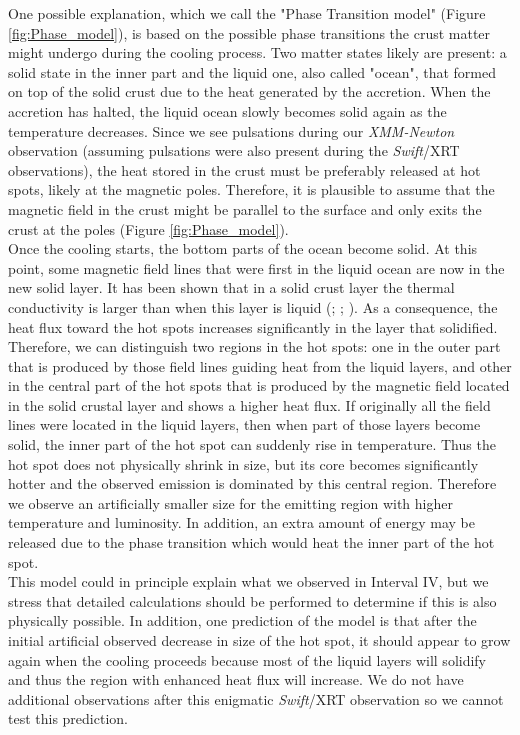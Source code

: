 \documentclass[a4paper,fleqn,usenatbib]{mnras}
\begin{document}
\indent One possible explanation, which we call the "Phase Transition model" (Figure \ref{fig:Phase_model}), is based on the possible phase transitions the crust matter might undergo during the cooling process. Two matter states likely are present: a solid state in the inner part and the liquid one, also called "ocean", that formed on top of the solid crust due to the heat generated by the accretion. When the accretion has halted, the liquid ocean slowly becomes solid again as the temperature decreases. Since we see pulsations during our \textit{XMM-Newton} observation (assuming pulsations were also present during the \textit{Swift}/XRT observations), the heat stored in the crust must be preferably released at hot spots, likely at the magnetic poles. Therefore, it is plausible to assume that the magnetic field in the crust might be parallel to the surface and only exits the crust at the poles (Figure \ref{fig:Phase_model}).\\
\indent Once the cooling starts, the bottom parts of the ocean become solid. At this point, some magnetic field lines that were first in the liquid ocean are now in the new solid layer. It has been shown that in a solid crust layer the thermal conductivity is larger than when this layer is liquid (\citealt{Horowitz2007}; \citealt{Brown2009}; \citealt{Mckinven2016}). As a consequence, the heat flux toward the hot spots increases significantly in the layer that solidified. Therefore, we can distinguish two regions in the hot spots: one in the outer part that is produced by those field lines guiding heat from the liquid layers, and other in the central part of the hot spots that is produced by the magnetic field located in the solid crustal layer and shows a higher heat flux. If originally all the field lines were located in the liquid layers, then when part of those layers become solid, the inner part of the hot spot can suddenly rise in temperature. Thus the hot spot does not physically shrink in size, but its core becomes significantly hotter and the observed emission is dominated by this central region. Therefore we observe an artificially smaller size for the emitting region with higher temperature and luminosity. In addition, an extra amount of energy may be released due to the phase transition which would heat the inner part of the hot spot.\\
\indent This model could in principle explain what we observed in Interval IV, but we stress that detailed calculations should be performed to determine if this is also physically possible. In addition, one prediction of the model is that after the initial artificial observed decrease in size of the hot spot, it should appear to grow again when the cooling proceeds because most of the liquid layers will solidify and thus the region with enhanced heat flux will increase. We do not have additional observations after this enigmatic \textit{Swift}/XRT observation so we cannot test this prediction.\\
\end{document}
